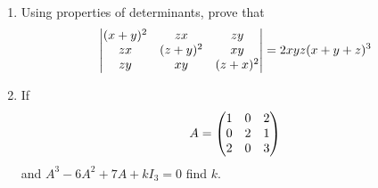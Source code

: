 \begin{enumerate}
	\item Using properties of determinants, prove that
	\begin{align*}
		\begin{vmatrix}(x + y)^2 & zx & zy \\
		zx & (z+y)^2 & xy \\
		zy & xy & (z+x)^2\end{vmatrix}
		 = 2xyz (x + y + z)^3
	\end{align*}
	
	\item If 
	\begin{align*}
		A = \begin{pmatrix}1 & 0 & 2\\
		0 & 2 & 1 \\
		2 & 0 & 3\end{pmatrix}
	\end{align*}
and $A^3-6A^2+7A+kI_3=0$ find $k$.

\end{enumerate}
